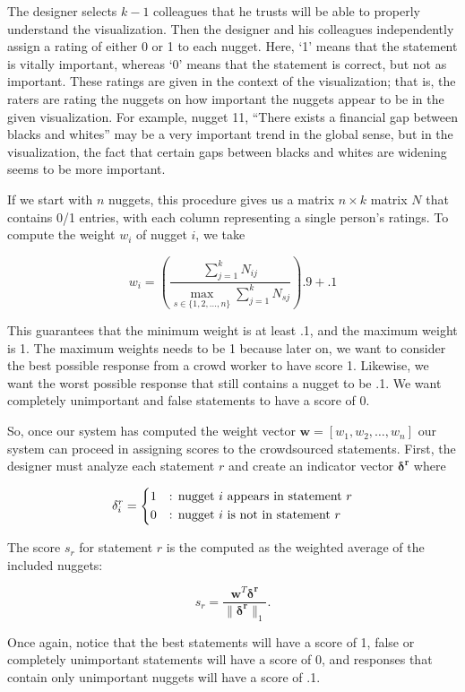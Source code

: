 \documentclass{sigchi}
\begin{document}
The designer selects $k-1$ colleagues that he trusts will be able to
properly understand the visualization. Then the designer and his
colleagues independently assign a rating of either 0 or 1 to each
nugget. Here, `1' means that the statement is vitally important,
whereas `0' means that the statement is correct, but not as important.
These ratings are given in the context of the visualization; that is,
the raters are rating the nuggets on how important the nuggets appear
to be in the given visualization. For example, nugget 11, ``There
exists a financial gap between blacks and whites'' may be a very
important trend in the global sense, but in the visualization, the
fact that certain gaps between blacks and whites are widening seems to
be more important.

If we start with $n$ nuggets, this procedure gives us a matrix
$n\times k$ matrix $N$ that contains 0/1 entries, with each column
representing a single person's ratings. To compute the weight $w_i$ of
nugget $i$, we take

\[w_i = \left( \frac{\sum_{j=1}^k N_{ij} }{\max_{s\in\{1,2,\dots,n\}} \sum_{j=1}^k N_{sj}} \right) .9 + .1 \]

This guarantees that the minimum weight is at least .1, and the
maximum weight is 1. The maximum weights needs to be 1 because later
on, we want to consider the best possible response from a crowd worker
to have score 1. Likewise, we want the worst possible response that
still contains a nugget to be .1. We want completely unimportant and
false statements to have a score of 0.

So, once our system has computed the weight vector $\mathbf{w} = [w_1,
w_2,\dots,w_n]$ our system can proceed in assigning scores to the
crowdsourced statements. First, the designer must analyze each
statement $r$ and create an indicator vector $\mathbf{\delta^r}$ where

\[\delta^r_i = \begin{dcases*}
    1 & : nugget $i$ appears in statement $r$\\
    0 & : nugget $i$ is not in statement $r$
    \end{dcases*}
\]

The score $s_r$ for statement $r$ is the computed as the weighted
average of the included nuggets:

\[s_r = \frac{\mathbf{w}^T\mathbf{\delta^r}}{\|\mathbf{\delta^r}\|_1}.
\]

Once again, notice that the best statements will have a score of 1,
false or completely unimportant statements will have a score of 0, and
responses that contain only unimportant nuggets will have a score of
.1.
\end{document}
